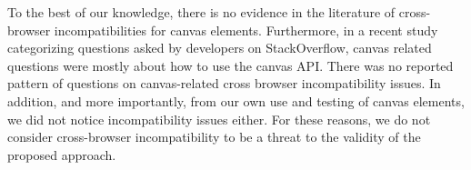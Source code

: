 To the best of our knowledge, there is no evidence in the literature of cross-browser incompatibilities for canvas elements. Furthermore, in a recent study \cite{bajaj2014mining} categorizing questions asked by developers on StackOverflow, canvas related questions were mostly about how to use the canvas API. There was no reported pattern of questions on canvas-related cross browser incompatibility issues. In addition, and more importantly, from our own use and testing of canvas elements, we did not notice incompatibility issues either. For these reasons, we do not consider cross-browser incompatibility to be a threat to the validity of the proposed approach.


